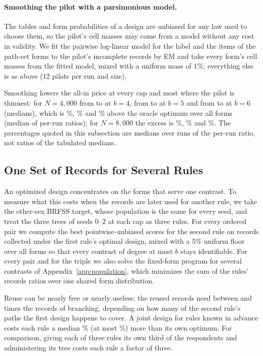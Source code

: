 \paragraph{Smoothing the pilot with a parsimonious model.}
The tables and form probabilities of a design are unbiased for any law used to choose them, so the pilot's cell masses may come from a model without any cost in validity. We fit the pairwise log-linear model for the label and the items of the path-set forms to the pilot's incomplete records by EM and take every form's cell masses from the fitted model, mixed with a uniform mass of $1\%$; everything else is as above (12 pilots per run and size).

Smoothing lowers the all-in price at every cap and most where the pilot is thinnest: for $N=4{,}000$ from \nSmoothEmpFourc{} to \nSmoothFourc{} at $b=4$, from \nSmoothEmpFivec{} to \nSmoothFivec{} at $b=5$ and from \nSmoothEmpSixc{} to \nSmoothSixc{} at $b=6$ (medians), which is \nSmoothOverFourc\%, \nSmoothOverFivec\% and \nSmoothOverSixc\% above the oracle optimum over all forms (median of per-run ratios); for $N=8{,}000$ the excess is \nSmoothOverFourd\%, \nSmoothOverFived\% and \nSmoothOverSixd\%. The percentages quoted in this subsection are medians over runs of the per-run ratio, not ratios of the tabulated medians.

\subsection{One Set of Records for Several Rules}\label{app:reuse}
An optimized design concentrates on the forms that serve one contrast. To measure what this costs when the records are later used for another rule, we take the other-sex BRFSS target, whose population is the same for every seed, and treat the three trees of seeds 0--2 at each cap as three rules. For every ordered pair we compute the best pointwise-unbiased scores for the second rule on records collected under the first rule's optimal design, mixed with a $5\%$ uniform floor over all forms so that every contrast of degree at most $b$ stays identifiable. For every pair and for the triple we also solve the fixed-form program for several contrasts of Appendix~\ref{app:population}, which minimizes the sum of the rules' records ratios over one shared form distribution.

Reuse can be nearly free or nearly useless: the reused records need between \nReuseMin{} and \nReuseMax{} times the records of branching, depending on how many of the second rule's paths the first design happens to cover. A joint design for rules known in advance costs each rule a median \nJointPenMed\% (at most \nJointPenMax\%) more than its own optimum. For comparison, giving each of three rules its own third of the respondents and administering its tree costs each rule a factor of three.

